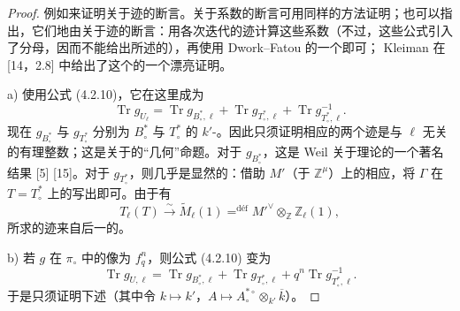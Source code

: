 \begin{proof}
例如来证明关于迹的断言。关于系数的断言可用同样的方法证明；也可以指出，它们地由关于迹的断言：用各次迭代的迹计算这些系数（不过，这些公式引入了分母，因而不能给出所述的），再使用 Dwork--Fatou 的一个即可；
Kleiman 在 [14，2.8] 中给出了这个的一个漂亮证明。

 a) 使用公式 (4.2.10)，它在这里成为
\[
 \operatorname{Tr}g_{U_\ell}
 =\operatorname{Tr}g_{B_\circ^*,\ell}
 +\operatorname{Tr}g_{T_\circ^*,\ell}
 +\operatorname{Tr}g_{T_\circ^*,\ell}^{-1}. \tag{4.3.0}
\]
现在 $g_{B_\circ^*}$ 与 $g_{T_\circ^*}$ 分别为 $B_\circ^*$ 与 $T_\circ^*$ 的 $k'$-。因此只须证明相应的两个迹是与 $\ell$ 无关的有理整数；这是关于的“几何”命题。对于 $g_{B_\circ^*}$，这是 Weil 关于理论的一个著名结果 [5] [15]。对于 $g_{T_\circ^*}$，则几乎是显然的：借助 $M'$（于 $\mathbb Z^\mu$）上的相应，将 $\Gamma$ 在 $T=T_\circ^*$ 上的写出即可。由于有
\[
 T_\ell(T)\xrightarrow{\sim}\widetilde M_\ell(1)
 \mathrel{\mathop{=}^{\mathrm{d\text{é}f}}}
 M'^\vee\otimes_{\mathbb Z}\mathbb Z_\ell(1),
\]
所求的迹来自后一的。

 b) 若 $g$ 在 $\pi_\circ$ 中的像为 $f_q^n$，则公式 (4.2.10) 变为
\[
 \operatorname{Tr}g_{U,\ell}
 =\operatorname{Tr}g_{B_\circ^*,\ell}
 +\operatorname{Tr}g_{T_\circ^*,\ell}
 +q^n\operatorname{Tr}g_{T_\circ^*,\ell}^{-1}. \tag{4.3.1}
\]
于是只须证明下述（其中令 $k\mapsto k'$，$A\mapsto A_\circ^{*\circ}\otimes_{k'}\overline k$）。
\end{proof}
